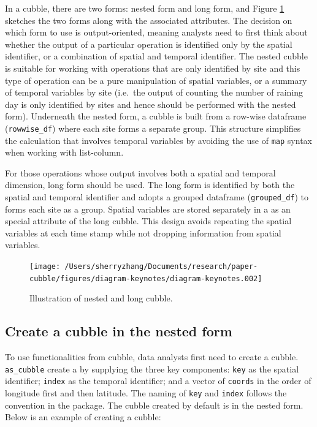 \documentclass[
]{jss}
\begin{document}
In a cubble, there are two forms: nested form and long form, and Figure
\ref{fig:def-cubble} sketches the two forms along with the associated
attributes. The decision on which form to use is output-oriented,
meaning analysts need to first think about whether the output of a
particular operation is identified only by the spatial identifier, or a
combination of spatial and temporal identifier. The nested cubble is
suitable for working with operations that are only identified by site
and this type of operation can be a pure manipulation of spatial
variables, or a summary of temporal variables by site (i.e.~the output
of counting the number of raining day is only identified by sites and
hence should be performed with the nested form). Underneath the nested
form, a cubble is built from a row-wise dataframe (\texttt{rowwise\_df})
where each site forms a separate group. This structure simplifies the
calculation that involves temporal variables by avoiding the use of
\texttt{map} syntax when working with list-column.

For those operations whose output involves both a spatial and temporal
dimension, long form should be used. The long form is identified by both
the spatial and temporal identifier and adopts a grouped dataframe
(\texttt{grouped\_df}) to forms each site as a group. Spatial variables
are stored separately in a  as an special attribute of the
long cubble. This design avoids repeating the spatial variables at each
time stamp while not dropping information from spatial variables.

\begin{CodeChunk}
\begin{figure}

{\centering \texttt{[image: /Users/sherryzhang/Documents/research/paper-cubble/figures/diagram-keynotes/diagram-keynotes.002]} 

}

\caption[Illustration of nested and long cubble]{Illustration of nested and long cubble.}\label{fig:def-cubble}
\end{figure}
\end{CodeChunk}

\hypertarget{create-a-cubble-in-the-nested-form}{%
\subsection{Create a cubble in the nested
form}\label{create-a-cubble-in-the-nested-form}}

To use functionalities from cubble, data analysts first need to create a
cubble. \texttt{as\_cubble} create a  by supplying the three
key components: \texttt{key} as the spatial identifier; \texttt{index}
as the temporal identifier; and a vector of \texttt{coords} in the order
of longitude first and then latitude. The naming of \texttt{key} and
\texttt{index} follows the convention in the  package. The
cubble created by default is in the nested form. Below is an example of
creating a cubble: \newline
\end{document}
